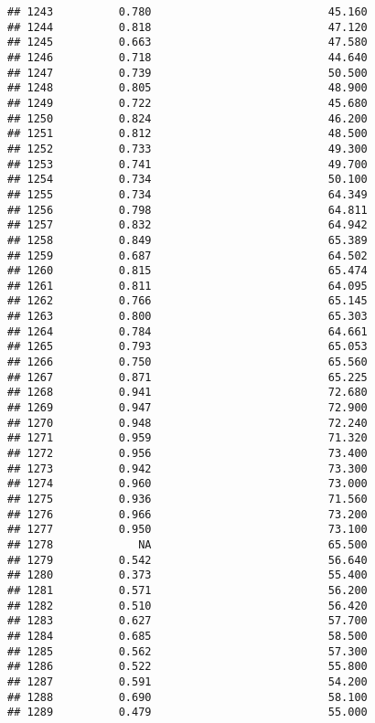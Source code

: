 \documentclass[
]{article}
\begin{document}
\begin{verbatim}
## 1243          0.780                           45.160
## 1244          0.818                           47.120
## 1245          0.663                           47.580
## 1246          0.718                           44.640
## 1247          0.739                           50.500
## 1248          0.805                           48.900
## 1249          0.722                           45.680
## 1250          0.824                           46.200
## 1251          0.812                           48.500
## 1252          0.733                           49.300
## 1253          0.741                           49.700
## 1254          0.734                           50.100
## 1255          0.734                           64.349
## 1256          0.798                           64.811
## 1257          0.832                           64.942
## 1258          0.849                           65.389
## 1259          0.687                           64.502
## 1260          0.815                           65.474
## 1261          0.811                           64.095
## 1262          0.766                           65.145
## 1263          0.800                           65.303
## 1264          0.784                           64.661
## 1265          0.793                           65.053
## 1266          0.750                           65.560
## 1267          0.871                           65.225
## 1268          0.941                           72.680
## 1269          0.947                           72.900
## 1270          0.948                           72.240
## 1271          0.959                           71.320
## 1272          0.956                           73.400
## 1273          0.942                           73.300
## 1274          0.960                           73.000
## 1275          0.936                           71.560
## 1276          0.966                           73.200
## 1277          0.950                           73.100
## 1278             NA                           65.500
## 1279          0.542                           56.640
## 1280          0.373                           55.400
## 1281          0.571                           56.200
## 1282          0.510                           56.420
## 1283          0.627                           57.700
## 1284          0.685                           58.500
## 1285          0.562                           57.300
## 1286          0.522                           55.800
## 1287          0.591                           54.200
## 1288          0.690                           58.100
## 1289          0.479                           55.000

\end{verbatim}
\end{document}
